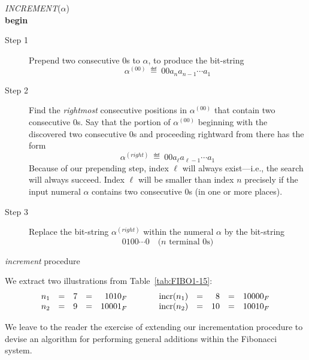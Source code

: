  {\em INCREMENT}($\alpha$) \\
{\bf begin}
\begin{description}
\item[{\sf Step} 1]
Prepend two consecutive $0$s to $\alpha$, to produce the bit-string
\[  \alpha^{(00)} \ \eqdef \  0 0 a_n a_{n-1} \cdots a_1 \]

\item[{\sf Step} 2]
Find the {\em rightmost} consecutive positions in $\alpha^{(00)}$ that contain two consecutive $0$s.  Say that the portion of $\alpha^{(00)}$ beginning with the discovered two consecutive $0$s and proceeding rightward from there has the form
\[  \alpha^{(right)} \ \eqdef \  0 0 a_\ell a_{\ell-1} \cdots a_1 \]
Because of our prepending step, index $\ell$ will always exist---i.e., the search will always succeed.   Index $\ell$ will be smaller than index $n$ precisely if the input numeral $\alpha$ contains two consecutive $0$s (in one or more places).

\item[{\sf Step} 3]
Replace the bit-string $\alpha^{(right)}$ within the numeral $\alpha$ by the bit-string
\[ 0 1 0 0 \cdots 0 \ \ \ \mbox{ ($n$ terminal $0$s)} \]
\end{description}
 {\em increment} procedure

\bigskip

\noindent We extract two illustrations from Table~\ref{tab:FIBO1-15}:
\[ \begin{array}{ccrcrcccrcr}
n_1 & = & 7 & = & 1010_F & \hspace*{.25in} & 
     \mbox{incr}(n_1) & = & 8 & = & 10000_F  \\ 
n_2 & = & 9 & = & 10001_F & \hspace*{.25in} &
     \mbox{incr}(n_2 ) & = & 10 &  = &10010_F
\end{array}
\]

\bigskip

We leave to the reader the exercise of extending our incrementation procedure to devise an algorithm for performing general additions within the Fibonacci system.


